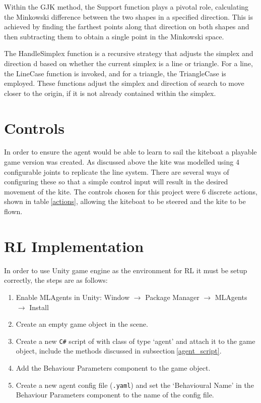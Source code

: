 Within the GJK method, the Support function plays a pivotal role, calculating the Minkowski difference between the two shapes in a specified direction. This is achieved by finding the farthest points along that direction on both shapes and then subtracting them to obtain a single point in the Minkowski space.

The HandleSimplex function is a recursive strategy that adjusts the simplex and direction d based on whether the current simplex is a line or triangle. For a line, the LineCase function is invoked, and for a triangle, the TriangleCase is employed. These functions adjust the simplex and direction of search to move closer to the origin, if it is not already contained within the simplex.


\section{Controls}
In order to ensure the agent would be able to learn to sail the kiteboat a playable game version was created. As discussed above the kite was modelled using 4 configurable joints to replicate the line system. There are several ways of configuring these so that a simple control input will result in the desired movement of the kite. The controls chosen for this project were 6 discrete actions, shown in table$~$\ref{actions}, allowing the kiteboat to be steered and the kite to be flown. 


\section{RL Implementation}\label{sec:RL_Implementation}

In order to use Unity game engine as the environment for RL it must be setup correctly, the steps are as follows:
\begin{enumerate}
    \item Enable MLAgents in Unity:
    Window $\rightarrow$ Package Manager $\rightarrow$ MLAgents $\rightarrow$ Install
    \item Create an empty game object in the scene.
    \item Create a new \texttt{C\#} script of with class of type `agent' and attach it to the game object, include the methods discussed in subsection$~$\ref{agent_script}.
    \item Add the Behaviour Parameters component to the game object.
    \item Create a new agent config file (\texttt{.yaml}) and set the `Behavioural Name' in the Behaviour Parameters component to the name of the config file.
\end{enumerate}  

